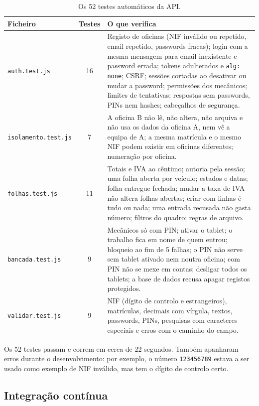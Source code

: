 \documentclass[a4paper,12pt]{article}
\begin{document}
\begin{table}[htbp]
\centering
\small
\begin{tabularx}{\textwidth}{@{}p{3.9cm}cL@{}}
\toprule
\textbf{Ficheiro} & \textbf{Testes} & \textbf{O que verifica} \\
\midrule
\texttt{auth.test.js} & 16 & Registo de oficinas (\ac{NIF} inválido ou repetido, email repetido, passwords fracas); login com a mesma mensagem para email inexistente e password errada; tokens adulterados e \texttt{alg: none}; \acs{CSRF}; sessões cortadas ao desativar ou mudar a password; permissões dos mecânicos; limites de tentativas; respostas sem passwords, PINs nem hashes; cabeçalhos de segurança. \\
\texttt{isolamento.test.js} & 7 & A oficina B não lê, não altera, não arquiva e não usa os dados da oficina A, nem vê a equipa de A; a mesma matrícula e o mesmo \ac{NIF} podem existir em oficinas diferentes; numeração por oficina. \\
\texttt{folhas.test.js} & 11 & Totais e \ac{IVA} ao cêntimo; autoria pela sessão; uma folha aberta por veículo; estados e datas; folha entregue fechada; mudar a taxa de \ac{IVA} não altera folhas abertas; criar com linhas é tudo ou nada; uma entrada recusada não gasta número; filtros do quadro; regras de arquivo. \\
\texttt{bancada.test.js} & 9 & Mecânicos só com PIN; ativar o tablet; o trabalho fica em nome de quem entrou; bloqueio ao fim de 5 falhas; o PIN não serve sem tablet ativado nem noutra oficina; com PIN não se mexe em contas; desligar todos os tablets; a base de dados recusa apagar registos protegidos. \\
\texttt{validar.test.js} & 9 & \ac{NIF} (dígito de controlo e estrangeiros), matrículas, decimais com vírgula, textos, passwords, PINs, pesquisas com caracteres especiais e erros com o caminho do campo. \\
\bottomrule
\end{tabularx}
\caption{Os 52 testes automáticos da API.}
\label{tab:testes}
\end{table}

Os 52 testes passam e correm em cerca de 22 segundos. Também apanharam erros durante o desenvolvimento: por exemplo, o número \texttt{123456789} estava a ser usado como exemplo de \ac{NIF} inválido, mas tem o dígito de controlo certo.

\subsection{Integração contínua}
\end{document}
